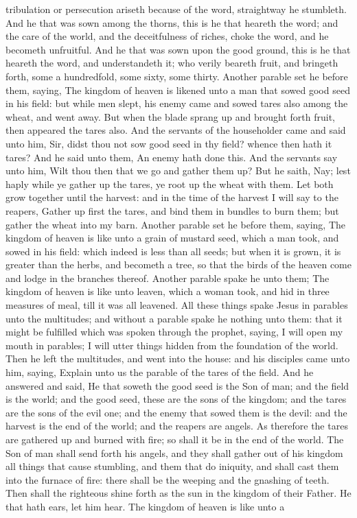 tribulation or persecution ariseth because of the word, straightway he stumbleth. And he that was sown among the thorns, this is he that heareth the word; and the care of the world, and the deceitfulness of riches, choke the word, and he becometh unfruitful. And he that was sown upon the good ground, this is he that heareth the word, and understandeth it; who verily beareth fruit, and bringeth forth, some a hundredfold, some sixty, some thirty.  Another parable set he before them, saying, The kingdom of heaven is likened unto a man that sowed good seed in his field: but while men slept, his enemy came and sowed tares also among the wheat, and went away. But when the blade sprang up and brought forth fruit, then appeared the tares also. And the servants of the householder came and said unto him, Sir, didst thou not sow good seed in thy field? whence then hath it tares? And he said unto them, An enemy hath done this. And the servants say unto him, Wilt thou then that we go and gather them up? But he saith, Nay; lest haply while ye gather up the tares, ye root up the wheat with them. Let both grow together until the harvest: and in the time of the harvest I will say to the reapers, Gather up first the tares, and bind them in bundles to burn them; but gather the wheat into my barn.  Another parable set he before them, saying, The kingdom of heaven is like unto a grain of mustard seed, which a man took, and sowed in his field: which indeed is less than all seeds; but when it is grown, it is greater than the herbs, and becometh a tree, so that the birds of the heaven come and lodge in the branches thereof.  Another parable spake he unto them; The kingdom of heaven is like unto leaven, which a woman took, and hid in three measures of meal, till it was all leavened.  All these things spake Jesus in parables unto the multitudes; and without a parable spake he nothing unto them: that it might be fulfilled which was spoken through the prophet, saying, I will open my mouth in parables; I will utter things hidden from the foundation of the world.  Then he left the multitudes, and went into the house: and his disciples came unto him, saying, Explain unto us the parable of the tares of the field. And he answered and said, He that soweth the good seed is the Son of man; and the field is the world; and the good seed, these are the sons of the kingdom; and the tares are the sons of the evil one; and the enemy that sowed them is the devil: and the harvest is the end of the world; and the reapers are angels. As therefore the tares are gathered up and burned with fire; so shall it be in the end of the world. The Son of man shall send forth his angels, and they shall gather out of his kingdom all things that cause stumbling, and them that do iniquity, and shall cast them into the furnace of fire: there shall be the weeping and the gnashing of teeth. Then shall the righteous shine forth as the sun in the kingdom of their Father. He that hath ears, let him hear.  The kingdom of heaven is like unto a 